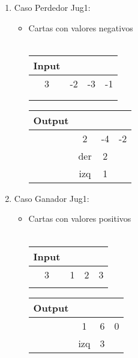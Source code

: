 \documentclass[11pt, a4paper, twoside]{article}
\begin{document}
\begin{enumerate}
	\item Caso Perdedor Jug1: 
		\begin{itemize}
			\item Cartas con valores negativos \\
			\\
				\begin{minipage}{0.4\textwidth}
					  \begin{tabular}{cccc}
						   Input \\
                           \hline
						   3 & -2 & -3 & -1 \\
						   \\
						   \\
					  \end{tabular}
				\end{minipage} 
				\begin{minipage}{0.3\textwidth}
					  \begin{tabular}{cccc}
						  Output\\
					      \hline
						   & 2   & -4  & -2 \\
						   & der & 2  & \\
						   & izq & 1  & \\
					  \end{tabular}
				\end{minipage} 
		\end{itemize}

	\item Caso Ganador Jug1: 
	
		\begin{itemize}
			\item Cartas con valores positivos \\
			\\
				\begin{minipage}{0.4\textwidth}
					  \begin{tabular}{cccc}
						   Input \\
                           \hline   
 						   3 & 1 & 2 & 3 \\
						   \\
					  \end{tabular}
				\end{minipage} 
				\begin{minipage}{0.3\textwidth}
					  \begin{tabular}{cccc}
						  Output\\
                          \hline
                 		   & 1   & 6  & 0 \\
						   & izq & 3  & \\
					  \end{tabular}
				\end{minipage} 
				

\end{itemize}
\end{enumerate}
\end{document}
